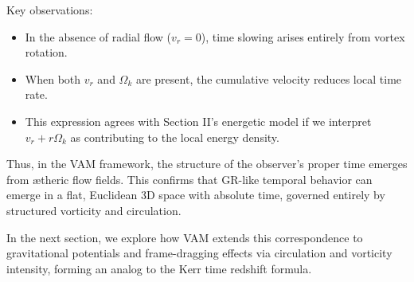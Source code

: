 Key observations:

\begin{itemize}
\item In the absence of radial flow (\(v_r = 0\)), time slowing arises entirely from vortex rotation.
\item When both \(v_r\) and \(\Omega_k\) are present, the cumulative velocity reduces local time rate.
\item This expression agrees with Section II's energetic model if we interpret \(v_r + r\Omega_k\) as contributing to the local energy density.
\end{itemize}

Thus, in the VAM framework, the structure of the observer’s proper time emerges from ætheric flow fields. This confirms that GR-like temporal behavior can emerge in a flat, Euclidean 3D space with absolute time, governed entirely by structured vorticity and circulation.

In the next section, we explore how VAM extends this correspondence to gravitational potentials and frame-dragging effects via circulation and vorticity intensity, forming an analog to the Kerr time redshift formula.